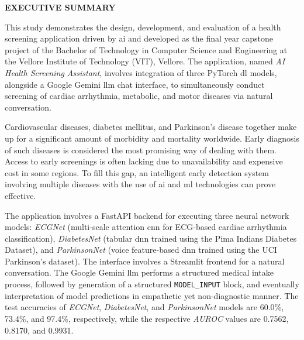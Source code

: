 \begin{center}
	\Large{\textbf{EXECUTIVE SUMMARY}}	
\end{center}
\vspace{1em}
\normalsize
\hspace{1cm} This study demonstrates the design, development, and evaluation of a health screening application driven by \ac{ai} and developed as the final year capstone project of the Bachelor of Technology in Computer Science and Engineering at the Vellore Institute of Technology (VIT), Vellore. The application, named \textit{AI Health Screening Assistant}, involves integration of three PyTorch \ac{dl} models, alongside a Google Gemini \ac{llm} chat interface, to simultaneously conduct screening of cardiac arrhythmia, metabolic, and motor diseases via natural conversation.

\hspace{1cm} Cardiovascular diseases, diabetes mellitus, and Parkinson's disease together make up for a significant amount of morbidity and mortality worldwide. Early diagnosis of such diseases is considered the most promising way of dealing with them. Access to early screenings is often lacking due to unavailability and expensive cost in some regions. To fill this gap, an intelligent early detection system involving multiple diseases with the use of \ac{ai} and \ac{ml} technologies can prove effective.

\hspace{1cm} The application involves a FastAPI backend for executing three neural network models: \textit{ECGNet} (multi-scale attention \ac{cnn} for ECG-based cardiac arrhythmia classification), \textit{DiabetesNet} (tabular \ac{dnn} trained using the Pima Indians Diabetes Dataset), and \textit{ParkinsonNet} (voice feature-based \ac{dnn} trained using the UCI Parkinson's dataset). The interface involves a Streamlit frontend for a natural conversation. The Google Gemini \ac{llm} performs a structured medical intake process, followed by generation of a structured \texttt{MODEL\_INPUT} block, and eventually interpretation of model predictions in empathetic yet non-diagnostic manner. The test accuracies of \textit{ECGNet}, \textit{DiabetesNet}, and \textit{ParkinsonNet} models are 60.0\%, 73.4\%, and 97.4\%, respectively, while the respective \textit{AUROC} values are 0.7562, 0.8170, and 0.9931.